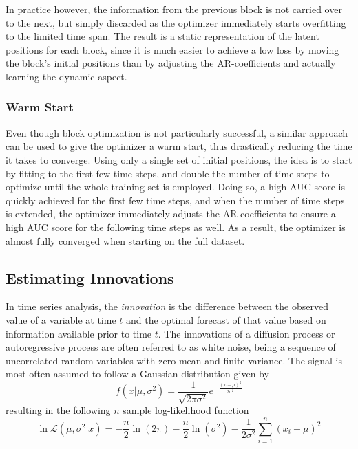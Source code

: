         In practice however, the information from the previous block is not carried over to the next, but simply discarded as the optimizer immediately starts overfitting to the limited time span. The result is a static representation of the latent positions for each block, since it is much easier to achieve a low loss by moving the block's initial positions than by adjusting the AR-coefficients and actually learning the dynamic aspect.
        
        
    \subsubsection{Warm Start}
    
        Even though block optimization is not particularly successful, a similar approach can be used to give the optimizer a warm start, thus drastically reducing the time it takes to converge. Using only a single set of initial positions, the idea is to start by fitting to the first few time steps, and double the number of time steps to optimize until the whole training set is employed. Doing so, a high AUC score is quickly achieved for the first few time steps, and when the number of time steps is extended, the optimizer immediately adjusts the AR-coefficients to ensure a high AUC score for the following time steps as well. As a result, the optimizer is almost fully converged when starting on the full dataset.
    
\subsection{Estimating Innovations}

    In time series analysis, the \emph{innovation} is the difference between the observed value of a variable at time $t$ and the optimal forecast of that value based on information available prior to time $t$. The innovations of a diffusion process or autoregressive process are often referred to as white noise, being a sequence of uncorrelated random variables with zero mean and finite variance. The signal is most often assumed to follow a Gaussian distribution given by
    \begin{equation}
        f(x\vert\mu,\sigma^2) = \frac{1}{\sqrt{2\pi\sigma^2}}e^{-\frac{(x-\mu)^2}{2\sigma^2}}
    \end{equation}
    resulting in the following $n$ sample log-likelihood function
    \begin{equation}
        \ln\mathcal{L}(\mu, \sigma^2\vert x) = -\frac{n}{2}\ln(2\pi) - \frac{n}{2}\ln(\sigma^2) - \frac{1}{2\sigma^2}\sum_{i=1}^n (x_i - \mu)^2
    \end{equation}
    
